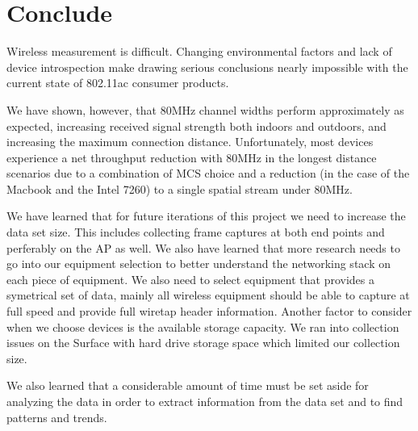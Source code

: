 \section{Conclude}
Wireless measurement is difficult. Changing environmental factors and
lack of device introspection make drawing serious conclusions nearly
impossible with the current state of 802.11ac consumer products.

We have shown, however, that 80MHz channel widths perform
approximately as expected, increasing received signal strength both
indoors and outdoors, and increasing the maximum connection distance.
Unfortunately, most devices experience a net throughput reduction with
80MHz in the longest distance scenarios due to a combination of MCS
choice and a reduction (in the case of the Macbook and the Intel 7260)
to a single spatial stream under 80MHz.

We have learned that for future iterations of this project we need to increase the data set size.
This includes collecting frame captures at both end points and perferably on the AP as well. We also
have learned that more research needs to go into our equipment selection to better understand
the networking stack on each piece of equipment. We also need to select equipment that provides a symetrical set of data, mainly all wireless equipment should be able to capture at full speed and provide full wiretap header information. Another factor to consider when we choose devices is the available storage capacity. We ran into collection issues on the Surface with hard drive storage space which limited our collection size.

We also learned that a considerable amount of time must be set aside for analyzing the data in order to extract information from the data set and to find patterns and trends.
